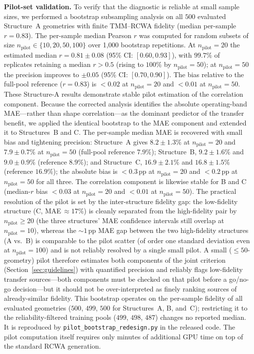 \documentclass[a4paper,fleqn]{cas-sc}
\begin{document}
\textbf{Pilot-set validation.} To verify that the diagnostic is reliable at small sample sizes, we performed a bootstrap subsampling analysis on all $500$ evaluated Structure~A geometries with finite TMM--RCWA fidelity (median per-sample $r=0.83$). The per-sample median Pearson $r$ was computed for random subsets of size $n_\text{pilot} \in \{10, 20, 50, 100\}$ over 1{,}000 bootstrap repetitions. At $n_\text{pilot} = 20$ the estimated median $r = 0.81 \pm 0.08$ (95\% CI: $[0.60, 0.93]$), with $99.7\%$ of replicates retaining a median $r > 0.5$ (rising to $100\%$ by $n_\text{pilot}=50$); at $n_\text{pilot} = 50$ the precision improves to $\pm 0.05$ (95\% CI: $[0.70, 0.90]$). The bias relative to the full-pool reference ($r = 0.83$) is $< 0.02$ at $n_\text{pilot} = 20$ and $< 0.01$ at $n_\text{pilot} = 50$. These Structure-A results demonstrate stable pilot estimation of the correlation component. Because the corrected analysis identifies the absolute operating-band MAE---rather than shape correlation---as the dominant predictor of the transfer benefit, we applied the identical bootstrap to the MAE component and extended it to Structures~B and C. The per-sample median MAE is recovered with small bias and tightening precision: Structure~A gives $8.2 \pm 1.3\%$ at $n_\text{pilot}=20$ and $7.9 \pm 0.7\%$ at $n_\text{pilot}=50$ (full-pool reference $7.9\%$); Structure~B, $9.2 \pm 1.6\%$ and $9.0 \pm 0.9\%$ (reference $8.9\%$); and Structure~C, $16.9 \pm 2.1\%$ and $16.8 \pm 1.5\%$ (reference $16.9\%$); the absolute bias is $<0.3$\,pp at $n_\text{pilot}=20$ and $<0.2$\,pp at $n_\text{pilot}=50$ for all three. The correlation component is likewise stable for B and C (median-$r$ bias $<0.03$ at $n_\text{pilot}=20$ and $<0.01$ at $n_\text{pilot}=50$). The practical resolution of the pilot is set by the inter-structure fidelity gap: the low-fidelity structure (C, MAE\,$\approx 17\%$) is cleanly separated from the high-fidelity pair by $n_\text{pilot}\geq 20$ (the three structures' MAE confidence intervals still overlap at $n_\text{pilot}=10$), whereas the $\sim 1$\,pp MAE gap between the two high-fidelity structures (A vs.\ B) is comparable to the pilot scatter (of order one standard deviation even at $n_\text{pilot}=100$) and is not reliably resolved by a single small pilot. A small ($\leq 50$-geometry) pilot therefore estimates both components of the joint criterion (Section~\ref{sec:guidelines}) with quantified precision and reliably flags low-fidelity transfer sources---both components must be checked on that pilot before a go/no-go decision---but it should not be over-interpreted as finely ranking sources of already-similar fidelity. This bootstrap operates on the per-sample fidelity of all evaluated geometries ($500$, $499$, $500$ for Structures~A, B, and~C); restricting it to the reliability-filtered training pools ($499$, $498$, $487$) changes no reported median. It is reproduced by \texttt{pilot\_bootstrap\_redesign.py} in the released code. The pilot computation itself requires only minutes of additional GPU time on top of the standard RCWA generation.
\end{document}
